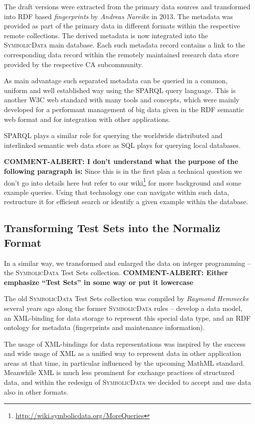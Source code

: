 \documentclass[a4paper,11pt]{article}
\def\SD{\textsc{SymbolicData}}
\begin{document}
The draft versions were extracted from the primary data sources and transformed
into RDF based \emph{fingerprints} by \emph{Andreas Nareike} in 2013.  The
metadata was provided as part of the primary data in different formats within
the respective remote collections. The derived metadata is now integrated into
the {\SD} main database. Each such metadata record contains a link to the
corresponding data record within the remotely maintained research data store
provided by the respective CA subcommunity.

As main advantage such separated metadata can be queried in a common, uniform
and well established way using the SPARQL query language. This is another W3C web
standard with many tools and concepts, which were mainly developed for a performant management of
big data given in the RDF semantic web format and for integration with other
applications. 

SPARQL plays a similar role for querying the worldwide distributed and
interlinked semantic web data store as SQL plays for querying local databases.

\textbf{COMMENT-ALBERT: I don't understand what the purpose of the
  following paragraph is:}
Since this is in the first plan a technical question we don't go into details
here but refer to our wiki\footnote{
  \url{http://wiki.symbolicdata.org/MoreQueries}} for more background and some
example queries.  Using that technology one can navigate within such data,
restructure it for efficient search or identify a given example within the
database.

\subsection{Transforming Test Sets into the Normaliz Format}

In a similar way, we transformed and enlarged the data on integer programming --
the {\SD} Test Sets collection. \textbf{COMMENT-ALBERT: Either
  emphasize ``Test Sets'' in some way or put it lowercase}

The old {\SD} Test Sets collection was compiled by \emph{Raymond Hemmecke}
several years ago along the former {\SD} rules -- develop a data model, an
XML-binding for data storage to represent this special data type, and an RDF
ontology for metadata (fingerprints and maintenance information).

The usage of XML-bindings for data representations was inspired by the success
and wide usage of XML as a unified way to represent data in other application
areas at that time, in particular influenced by the upcoming MathML standard.
Meanwhile XML is much less prominent for exchange practices of structured data,
and within the redesign of {\SD} we decided to accept and use data also in
other formats. 
\end{document}
